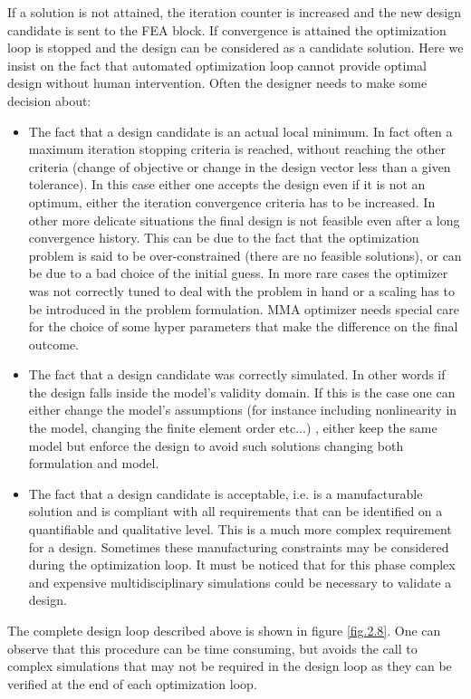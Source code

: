 If a solution is not attained, the iteration counter is increased and the new design candidate is sent to the FEA block.
If convergence is attained the optimization loop is stopped and the design can be considered as a candidate solution. Here we insist on the fact that automated optimization loop cannot provide optimal design without human intervention. 
Often the designer needs to make some decision about:
\begin{itemize}
\item The fact that a design candidate is an actual local minimum. In fact often a maximum iteration stopping criteria is reached, without reaching the other criteria (change of objective or change in the design vector less than a given tolerance). In this case either one accepts the design even if it is not an optimum, either the iteration convergence criteria has to be increased. In other more delicate situations the final design is not feasible even after a long convergence history. This can be due to the fact that the optimization problem is said to be over-constrained (there are no feasible solutions), or can be due to a bad choice of the initial guess. In more rare cases the optimizer was not correctly tuned to deal with the problem in hand or a scaling has to be introduced in the problem formulation. MMA optimizer needs special care for the choice of some hyper parameters that make the difference on the final outcome.
\item The fact that a design candidate was correctly simulated. In other words if the design falls inside the model's validity domain. If this is the case one can either change the model's assumptions (for instance including nonlinearity in the model, changing the finite element order etc...) , either keep the same model but enforce the design to avoid such solutions changing both formulation and model. 
\item The fact that a design candidate is acceptable, i.e. is a manufacturable solution and is compliant with all requirements that can be identified on a quantifiable and qualitative level. This is a much more complex requirement for a design. Sometimes these manufacturing constraints may be considered during the optimization loop. It must be noticed that for this phase complex and expensive multidisciplinary simulations could be necessary to validate a design. 
\end{itemize}
The complete design loop described above is shown in figure \ref{fig.2.8}. One can observe that this procedure can be time consuming, but avoids the call to complex simulations that may not be required in the design loop as they  can be verified at the end of each optimization loop.
